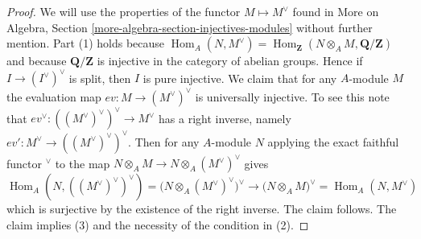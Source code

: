 \documentclass{stacks-project}
\theoremstyle{plain}
\theoremstyle{definition}
\theoremstyle{remark}
\numberwithin{equation}{subsection}
\def\Hom{\mathop{\mathrm{Hom}}\nolimits}
\begin{document}
\begin{proof}
We will use the properties of the functor $M \mapsto M^\vee$ found in
More on Algebra, Section \ref{more-algebra-section-injectives-modules}
without further mention. Part (1) holds because
$\Hom_A(N, M^\vee) =
\Hom_\mathbf{Z}(N \otimes_A M, \mathbf{Q}/\mathbf{Z})$
and because $\mathbf{Q}/\mathbf{Z}$ is injective in the category of
abelian groups. Hence if $I \to (I^\vee)^\vee$ is split, then
$I$ is pure injective. We claim that for any $A$-module $M$ the
evaluation map $ev : M \to (M^\vee)^\vee$ is universally injective.
To see this note that $ev^\vee : ((M^\vee)^\vee)^\vee \to M^\vee$
has a right inverse, namely $ev' : M^\vee \to ((M^\vee)^\vee)^\vee$.
Then for any $A$-module $N$ applying the exact faithful functor
${}^\vee$ to the map $N \otimes_A M \to N \otimes_A (M^\vee)^\vee$
gives
$$
\Hom_A(N, ((M^\vee)^\vee)^\vee) =
\Big(N \otimes_A (M^\vee)^\vee\Big)^\vee
\to
\Big(N \otimes_A M\Big)^\vee =
\Hom_A(N, M^\vee)
$$
which is surjective by the existence of the right inverse. The claim follows.
The claim implies (3) and the necessity of the condition in (2).
\end{proof}
\end{document}
